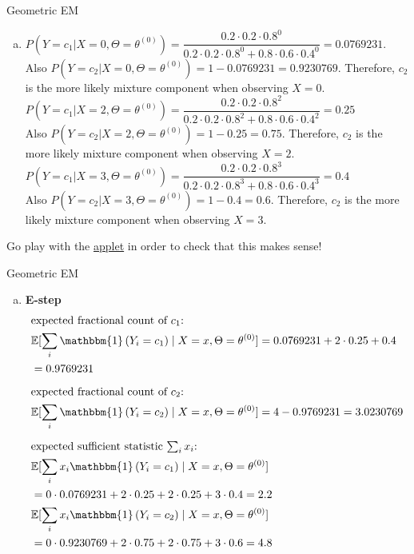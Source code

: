 \documentclass{beamer}\usepackage[]{graphicx}\usepackage[]{color}
\newcommand{\id}[1]{\mathbbm{1}\left(#1\right)}
\begin{document}
\begin{frame}{Geometric EM}
\small
\begin{enumerate}[b)]
\item $ P(Y = c_{1}|X=0, \Theta=\theta^{(0)}) =
  \dfrac{0.2\cdot 0.2\cdot
    0.8^{0}}{0.2\cdot
    0.2\cdot 0.8^{0} + 0.8 \cdot 0.6 \cdot 0.4^{0}} = 0.0769231 $.\\ Also 
  $ P(Y = c_{2}|X=0, \Theta=\theta^{(0)})  = 1 -
  0.0769231 = 0.9230769$. Therefore, $c_2$
  is the more likely mixture component when observing $X=0$.
\\ \vspace{.4cm}
$ P(Y = c_{1}|X=2, \Theta=\theta^{(0)}) = \dfrac{0.2\cdot 0.2\cdot 0.8^{2}}{0.2\cdot 0.2\cdot 0.8^{2} + 0.8 \cdot 0.6 \cdot 0.4^{2}} = 0.25 $\\ Also 
  $ P(Y = c_{2}|X=2, \Theta=\theta^{(0)})  = 1 -
  0.25 = 0.75$. Therefore, $c_2$
  is the more likely mixture component when observing $X=2$.
\\ \vspace{.4cm}
$ P(Y = c_{1}|X=3, \Theta=\theta^{(0)}) = \dfrac{0.2\cdot 0.2\cdot 0.8^{3}}{0.2\cdot 0.2\cdot 0.8^{3} + 0.8 \cdot 0.6 \cdot 0.4^{3}} = 0.4 $\\ Also 
  $ P(Y = c_{2}|X=3, \Theta=\theta^{(0)})  = 1 -
  0.4 = 0.6$. Therefore, $c_2$
  is the more likely mixture component when observing $X=3$.
\end{enumerate}
  Go play with the \href{https://ocw.mit.edu/ans7870/18/18.05/s14/applets/probDistrib.html}{applet} in order to check that this makes sense!
\end{frame}

\begin{frame}{Geometric EM}
\small
\begin{enumerate}[c)]
\item \textbf{E-step}\begin{align*}
&\mbox{expected fractional count of $c_1$:}\\ 
                       &\mathbb{E}[\sum_{i}\id{Y_{i}=c_{1}}\mid X=x, \Theta=\theta^{(0)}] = 0.0769231 + 
2\cdot 0.25 + 0.4 \\
&= 0.9769231 \\[2mm]
&\mbox{expected fractional count of $c_2$:}\\ 
                       &\mathbb{E}[\sum_{i}\id{Y_{i}=c_{2}}\mid X=x, \Theta=\theta^{(0)}] = 4 - 0.9769231 = 3.0230769 \\[2mm]
&\mbox{expected sufficient statistic $\sum_i x_i$:}\\
&\mathbb{E}[\sum_{i}x_{i}\id{Y_{i}=c_{1}}\mid X=x,
  \Theta=\theta^{(0)}]\\  
                       &=0 \cdot 0.0769231 + 
2 \cdot 0.25 + 2 \cdot
  0.25 + 3 \cdot 0.4 = 2.2 \\
&\mathbb{E}[\sum_{i}x_{i}\id{Y_{i}=c_{2}}\mid X=x, \Theta=\theta^{(0)}]\\ 
                       &= 0 \cdot 0.9230769 + 
 2 \cdot 0.75 + 2 \cdot
                         0.75 +
                         3 \cdot 0.6 
                         = 4.8
\end{align*}
\end{enumerate}
\end{frame}
\end{document}
